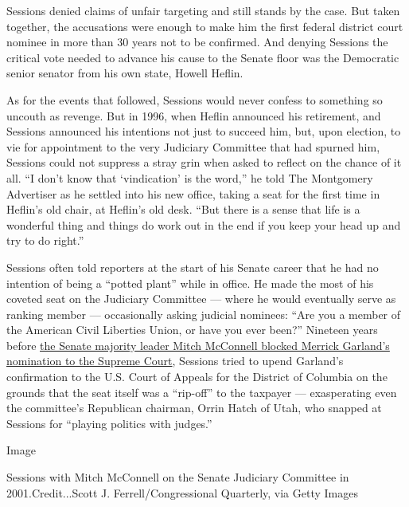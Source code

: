 Sessions denied claims of unfair targeting and still stands by the case.
But taken together, the accusations were enough to make him the first
federal district court nominee in more than 30 years not to be
confirmed. And denying Sessions the critical vote needed to advance his
cause to the Senate floor was the Democratic senior senator from his own
state, Howell Heflin.

As for the events that followed, Sessions would never confess to
something so uncouth as revenge. But in 1996, when Heflin announced his
retirement, and Sessions announced his intentions not just to succeed
him, but, upon election, to vie for appointment to the very Judiciary
Committee that had spurned him, Sessions could not suppress a stray grin
when asked to reflect on the chance of it all. ``I don't know that
`vindication' is the word,'' he told The Montgomery Advertiser as he
settled into his new office, taking a seat for the first time in
Heflin's old chair, at Heflin's old desk. ``But there is a sense that
life is a wonderful thing and things do work out in the end if you keep
your head up and try to do right.''

Sessions often told reporters at the start of his Senate career that he
had no intention of being a ``potted plant'' while in office. He made
the most of his coveted seat on the Judiciary Committee --- where he
would eventually serve as ranking member --- occasionally asking
judicial nominees: ``Are you a member of the American Civil Liberties
Union, or have you ever been?'' Nineteen years before
\href{https://www.nytimes3xbfgragh.onion/2016/03/17/us/politics/supreme-court-merrick-garland-senate.html}{the
Senate majority leader Mitch McConnell blocked Merrick Garland's
nomination to the Supreme Court}, Sessions tried to upend Garland's
confirmation to the U.S. Court of Appeals for the District of Columbia
on the grounds that the seat itself was a ``rip-off'' to the taxpayer
--- exasperating even the committee's Republican chairman, Orrin Hatch
of Utah, who snapped at Sessions for ``playing politics with judges.''

Image

Sessions with Mitch McConnell on the Senate Judiciary Committee in
2001.Credit...Scott J. Ferrell/Congressional Quarterly, via Getty Images

